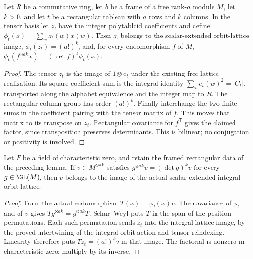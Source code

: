 \begin{lemma}
\label{lem:rectangular-bilinear-covector}
\leanok
Let $R$ be a commutative ring, let $b$ be a frame of a free rank-$a$
module $M$, let $k>0$, and let $t$ be a rectangular tableau with $a$ rows
and $k$ columns. In the tensor basis let $z_t$ have the integer
polytabloid coefficients and define $\phi_t(x)=\sum_w z_t(w)x(w)$.
Then $z_t$ belongs to the scalar-extended orbit-lattice image,
$\phi_t(z_t)=(a!)^k$, and, for every endomorphism $f$ of $M$,
$\phi_t(f^{\otimes ak}x)=(\det f)^k\phi_t(x)$.
\end{lemma}
\begin{proof}
The tensor $z_t$ is the image of $1\otimes e_t$ under the existing free
lattice realization. Its square coefficient sum is the integral identity
$\sum_w e_t(w)^2=|C_t|$, transported along the alphabet equivalence
and the integer map to $R$. The rectangular column group has order
$(a!)^k$. Finally interchange the two finite sums in the coefficient
pairing with the tensor matrix of $f$. This moves that matrix to its
transpose on $z_t$. Rectangular covariance for $f^{\mathsf T}$ gives
the claimed factor, since transposition preserves determinants. This is
bilinear; no conjugation or positivity is involved.
\end{proof}

\begin{lemma}
\label{lem:rectangular-determinant-weight-span}
\leanok
Let $F$ be a field of characteristic zero, and retain the framed rectangular data
of the preceding lemma. If $v\in M^{\otimes ak}$ satisfies
$g^{\otimes ak}v=(\det g)^kv$ for every $g\in\GL(M)$, then $v$
belongs to the image of the actual scalar-extended integral orbit lattice.
\end{lemma}
\begin{proof}
Form the actual endomorphism $T(x)=\phi_t(x)v$. The covariance of
$\phi_t$ and of $v$ gives $Tg^{\otimes ak}=g^{\otimes ak}T$.
Schur--Weyl puts $T$ in the span of the position permutations. Each such
permutation sends $z_t$ into the integral lattice image, by the proved
intertwining of the integral orbit action and tensor reindexing. Linearity
therefore puts $Tz_t=(a!)^kv$ in that image. The factorial is nonzero
in characteristic zero; multiply by its inverse.
\end{proof}

